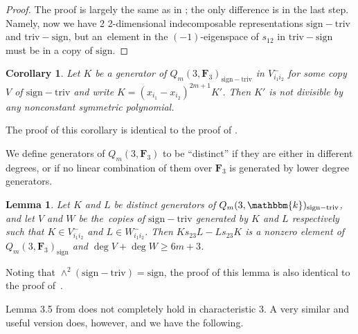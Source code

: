 \documentclass[11pt]{article}
\numberwithin{equation}{section}
\newtheorem{Corollary}[Theorem]{Corollary}
\newtheorem{Lemma}[Theorem]{Lemma}
\theoremstyle{definition}
\numberwithin{equation}{section}
\renewcommand{\k}{\mathbbm{k}}
\newcommand{\sign}{\mathrm{sign}}
\newcommand{\siv}{\mathrm{sign-triv}}
\newcommand{\tign}{\mathrm{triv-sign}}
\begin{document}
\begin{proof}
 The proof is largely the same as in \cite{wang2022explicit}; the only difference is in the last step. Namely, now we have 2 2-dimensional indecomposable representations $\siv$ and $\tign$, but an~element in the $(-1)$-eigenspace of $s_{12}$ in $\tign$ must be in a copy of $\sign$.
\end{proof}

\begin{Corollary}\label{cor:3.2}
 Let $K$ be a generator of $Q_m(3,\mathbf{F}_3)_\siv$ in $V_{i_1i_2}^-$ for some copy $V$ of $\siv$ and write $K=(x_{i_1}-x_{i_2})^{2m+1}K'$. Then $K'$ is not divisible by any nonconstant symmetric polynomial.
\end{Corollary}

The proof of this corollary is identical to the proof of \cite[Corollary 3.3]{wang2022explicit}.

We define generators of $Q_m(3,\mathbf{F}_3)$ to be ``distinct'' if they are either in different degrees, or if no linear combination of them over $\mathbf{F}_3$ is generated by lower degree generators.

\begin{Lemma}\label{lem:3.3}
 Let $K$ and $L$ be distinct generators of $Q_m(3,\k)_\siv$, and let $V$ and $W$ be the~copies of $\siv$ generated by $K$ and $L$ respectively such that $K\in V_{i_1i_2}^{-}$ and $L\in W_{i_1i_2}^{-}$. Then $Ks_{23}L - Ls_{23}K$ is a nonzero element of $Q_m(3,\mathbf{F}_3)_{\sign}$ and $\deg V+\deg W\geq 6m+3$.
\end{Lemma}

Noting that $\wedge^2(\siv) = \sign$, the proof of this lemma is also identical to the proof of~\mbox{\cite[Lemma 3.4]{wang2022explicit}}.

Lemma 3.5 from \cite{wang2022explicit} does not completely hold in characteristic $3$. A very similar and useful version does, however, and we have the following.
\end{document}

